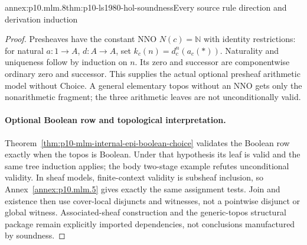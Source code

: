 \begin{annexitem}{annex:p10.mlm.8}{thm:p10-ls1980-hol-soundness}{Every source rule direction and derivation induction}
\begin{proof}
Presheaves have the constant NNO \(N(c)=\mathbb N\) with identity
restrictions: for natural \(a:1\to A\), \(d:A\to A\), set
\(k_c(n)=d_c^n(a_c(*))\). Naturality and uniqueness follow by induction on
\(n\). Its zero and successor are componentwise ordinary zero and successor.
This supplies the actual optional presheaf arithmetic model without Choice.
A general elementary topos without an NNO gets only the nonarithmetic
fragment; the three arithmetic leaves are not unconditionally valid.

\paragraph{Optional Boolean row and topological interpretation.}
Theorem~\ref{thm:p10-mlm-internal-epi-boolean-choice} validates the Boolean
row exactly when the topos is Boolean. Under that hypothesis its leaf is
valid and the same tree induction applies; the body two-stage example
refutes unconditional validity. In sheaf models, finite-context validity
is subsheaf inclusion, so Annex~\ref{annex:p10.mlm.5} gives exactly the same
assignment tests. Join and existence then use cover-local disjuncts and
witnesses, not a pointwise disjunct or global witness. Associated-sheaf
construction and the generic-topos structural package remain explicitly
imported dependencies, not conclusions manufactured by soundness.
\end{proof}
\end{annexitem}


